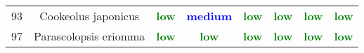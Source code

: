 \documentclass{report}\usepackage[]{graphicx}\usepackage[]{color}
\begin{document}
\begin{table}[ht]
{\begin{tabular}{cccccccc}
   93 & Cookeolus japonicus & \textcolor{green}{\textbf{low}} & \textcolor{blue}{\textbf{medium}} & \textcolor{green}{\textbf{low}} & \textcolor{green}{\textbf{low}} & \textcolor{green}{\textbf{low}} & \textcolor{green}{\textbf{low}} \\ 
   97 & Parascolopsis eriomma & \textcolor{green}{\textbf{low}} & \textcolor{green}{\textbf{low}} & \textcolor{green}{\textbf{low}} & \textcolor{green}{\textbf{low}} & \textcolor{green}{\textbf{low}} & \textcolor{green}{\textbf{low}} \\ 
   \hline
\end{tabular}
}
\end{table}

\clearpage
\newpage

\setlength{\tabcolsep}{5pt}

\end{document}
